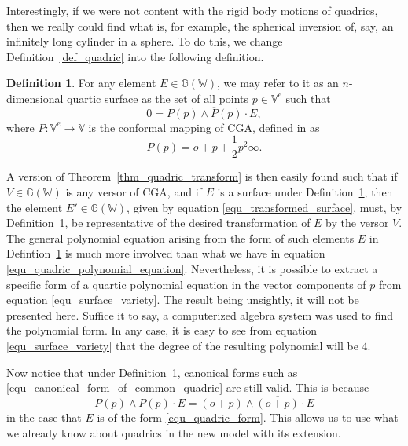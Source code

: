 \documentclass{birkjour}
\theoremstyle{definition}
\newtheorem{defn}[thm]{Definition}
\theoremstyle{remark}
\numberwithin{equation}{section}
\newcommand{\G}{\mathbb{G}}
\newcommand{\V}{\mathbb{V}}
\newcommand{\W}{\mathbb{W}}
\newcommand{\nvao}{o}
\newcommand{\nvai}{\infty}
\begin{document}
Interestingly, if we were not content with the rigid body motions of
quadrics, then we really could find what is, for example, the spherical
inversion of, say, an infinitely long cylinder in a sphere.  To do this, we change
Definition~\ref{def_quadric} into the following definition.
\begin{defn}\label{def_surface}
For any element $E\in\G(\W)$, we may refer to it as an $n$-dimensional
quartic surface as the set of all points $p\in\V^e$ such that
\begin{equation}\label{equ_surface_variety}
0 = P(p)\wedge\overline{P}(p)\cdot E,
\end{equation}
where $P:\V^e\to\V$ is the conformal mapping of CGA, defined in \cite{} as
\begin{equation}
P(p) = \nvao + p + \frac{1}{2}p^2\nvai.
\end{equation}
\end{defn}
A version of Theorem~\ref{thm_quadric_transform} is then easily found
such that if $V\in\G(\W)$ is any versor of CGA, and if $E$
is a surface under Definition~\ref{def_surface}, then the element $E'\in\G(\W)$,
given by equation \eqref{equ_transformed_surface}, must, by Definition~\ref{def_surface},
 be representative of the desired transformation of $E$ by the versor $V$.  The general
polynomial equation arising from the form of
such elements $E$ in Defintion~\ref{def_surface} is much more involved than
what we have in equation \eqref{equ_quadric_polynomial_equation}.  Nevertheless, it is possible to extract
a specific form of a quartic polynomial equation in
the vector components of $p$ from equation \eqref{equ_surface_variety}.
The result being unsightly, it will not be presented here.  Suffice it to say, a computerized
algebra system was used to find the polynomial form.  In any case, it is easy
to see from equation \eqref{equ_surface_variety} that the degree of the resulting
polynomial will be 4.

Now notice that under Definition~\ref{def_surface}, canonical forms
such as \eqref{equ_canonical_form_of_common_quadric} are still valid.
This is because
\begin{equation}
P(p)\wedge\overline{P}(p)\cdot E = (\nvao+p)\wedge\overline{(\nvao+p)}\cdot E
\end{equation}
in the case that $E$ is of the form \eqref{equ_quadric_form}.  This allows
us to use what we already know about quadrics in the new model with its extension.
\end{document}
